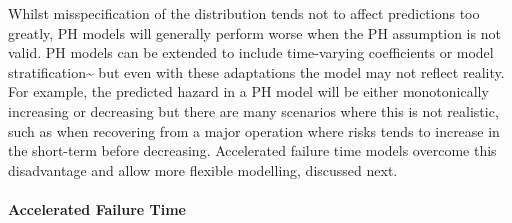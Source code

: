 \documentclass[
  letterpaper,
]{scrbook}
\let\oldparagraph\paragraph
\renewcommand{\paragraph}[1]{\oldparagraph{#1}\mbox{}}
\theoremstyle{plain}
\theoremstyle{definition}
\theoremstyle{remark}
\begin{document}
Whilst misspecification of the distribution tends not to affect
predictions too greatly, PH models will generally perform worse when the
PH assumption is not valid. PH models can be extended to include
time-varying coefficients or model
stratification\textasciitilde{}\cite{Cox1972} but even with these
adaptations the model may not reflect reality. For example, the
predicted hazard in a PH model will be either monotonically increasing
or decreasing but there are many scenarios where this is not realistic,
such as when recovering from a major operation where risks tends to
increase in the short-term before decreasing. Accelerated failure time
models overcome this disadvantage and allow more flexible modelling,
discussed next.

\paragraph{Accelerated Failure Time}
\end{document}
